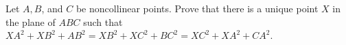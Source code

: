 Let $A, B$, and $C$ be noncollinear points. Prove that there is a unique point $X$ in the plane of $ABC$ such that $XA^2 + XB^2 + AB^2 = XB^2 + XC^2 + BC^2 = XC^2 + XA^2 + CA^2$.
